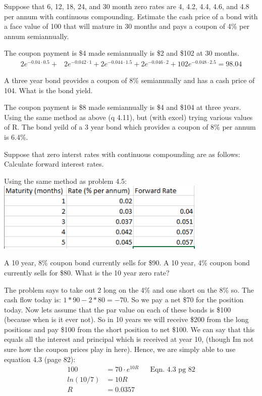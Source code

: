 \documentclass[12pt]{article}
\newenvironment{problem}[3][Problem]{\begin{trivlist}
\item[\hskip \labelsep {\bfseries #1}\hskip \labelsep {\bfseries #2.}]}{\end{trivlist}}
\begin{document}
\begin{problem}{4.11}. Suppose that 6, 12, 18, 24, and 30 month zero rates are 4, 4.2, 4.4, 4.6, and 4.8 per annum with continuous compounding. Estimate the cash price of a bond with a face value of 100 that will mature in 30 months and pays a coupon of 4\% per annum semiannually. 

The coupon payment is \$4 made semiannually is \$2 and \$102 at 30 months. 
\begin{align*}
2e^{-0.04 \cdot 0.5} +& 2e^{-0.042 \cdot 1} + 2e^{-0.044 \cdot 1.5}+2e^{-0.046 \cdot 2} + 102e^{-0.048 \cdot 2.5} = 98.04
\end{align*}
\end{problem}

\begin{problem}{4.12}. A three year bond provides a coupon of 8\% semiannually and has a cash price of 104. What is the bond yield. 

The coupon payment is \$8 made semiannually is \$4 and \$104 at three years. Using the same method as above (q 4.11), but (with excel) trying various values of R. The bond yeild of a 3 year bond which provides a coupon of 8\% per annum is 6.4\%. 
\end{problem}


\begin{problem}{4.14}. Suppose that zero interst rates with continuous compounding are as follows: Calculate forward interest rates. 

Using the same method as problem 4.5: \\
\includegraphics[width=0.75\textwidth]{mod3_p414.png}
\end{problem}

\begin{problem}{4.16}. A 10 year, 8\% coupon bond currently sells for \$90. A 10 year, 4\% coupon bond currently sells for \$80. What is the 10 year zero rate? 

The problem says to take out 2 long on the 4\% and one short on the  8\% so. The cash flow today is: $1*90 - 2*80 = -70$. So we pay a net \$70 for the position today. Now lets assume that the par value on each of these bonds is \$100 (because when is it ever not). So in 10 years we will receive \$200 from the long positions and pay \$100 from the short position to net \$100. We can say that this equals all the interest and principal which is received at year 10, (though Im not sure how the coupon prices play in here). Hence, we are simply able to use equation 4.3 (page 82):
\begin{align*}
100 &= 70\cdot e^{10R} && \text{Eqn. 4.3 pg 82} \\
ln(10/7) &= 10R \\
R &= 0.0357 
\end{align*}
\end{problem}
\end{document}

